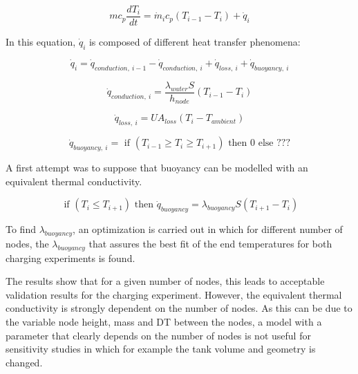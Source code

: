 \begin{equation}
mc_p \frac{dT_i}{dt}=\dot{m}_ic_p(T_{i-1} - T_i) + \dot{q}_i
\label{eq:}
\end{equation}

In this equation, $\dot{q}_i$ is composed of different heat transfer phenomena:

\begin{equation}
\dot{q}_i = \dot{q}_{conduction,~i-1} - \dot{q}_{conduction,~i} + \dot{q}_{loss,~i} +  \dot{q}_{buoyancy,~i}
\label{eq:}
\end{equation}

\begin{equation}
\dot{q}_{conduction,~i} = \frac{\lambda_{water} S}{h_{node}} (T_{i-1} - T_i) 
\label{eq:}
\end{equation}

\begin{equation}
\dot{q}_{loss,~i} = UA_{loss}(T_{i} - T_{ambient}) 
\label{eq:}
\end{equation}

\begin{equation}
\dot{q}_{buoyancy,~i} = \text{ if } (T_{i-1} \geq T_i \geq T_{i+1}) \text{ then } 0 \text{ else } ???
\label{eq:}
\end{equation}

A first attempt was to suppose that buoyancy can be modelled with an equivalent thermal conductivity. 

\begin{equation}
\text{ if } (T_{i} \leq T_{i+1}) \text{ then } \dot{q}_{buoyancy} = \lambda_{buoyancy} S (T_{i+1}-T_i)
\label{eq:}
\end{equation}


To find $\lambda_{buoyancy}$, an optimization is carried out in which for different number of nodes, the $\lambda_{buoyancy}$ that assures the best fit of the end temperatures for both charging experiments is found.

The results show that for a given number of nodes, this leads to acceptable validation results for the charging experiment.  However, the equivalent thermal conductivity is strongly dependent on the number of nodes.  As this can be due to the variable node height, mass and DT between the nodes, a model with a parameter that clearly depends on the number of nodes is not useful for sensitivity studies in which for example the tank volume and geometry is changed.

